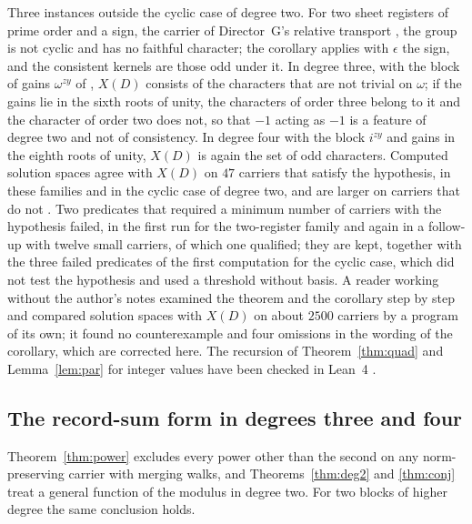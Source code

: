 Three instances outside the cyclic case of degree two. For two sheet registers of prime order and a sign, the carrier of Director~G's relative transport \cite{dgr}, the group is not cyclic and has no faithful character; the corollary applies with $\epsilon$ the sign, and the consistent kernels are those odd under it. In degree three, with the block of gains $\omega^{zy}$ of \cite{g9}, $X(D)$ consists of the characters that are not trivial on $\omega$; if the gains lie in the sixth roots of unity, the characters of order three belong to it and the character of order two does not, so that $-1$ acting as $-1$ is a feature of degree two and not of consistency. In degree four with the block $i^{zy}$ and gains in the eighth roots of unity, $X(D)$ is again the set of odd characters. Computed solution spaces agree with $X(D)$ on $47$ carriers that satisfy the hypothesis, in these families and in the cyclic case of degree two, and are larger on carriers that do not \cite{comp4s}. Two predicates that required a minimum number of carriers with the hypothesis failed, in the first run for the two-register family and again in a follow-up with twelve small carriers, of which one qualified; they are kept, together with the three failed predicates of the first computation for the cyclic case, which did not test the hypothesis and used a threshold without basis. A reader working without the author's notes examined the theorem and the corollary step by step and compared solution spaces with $X(D)$ on about $2500$ carriers by a program of its own; it found no counterexample and four omissions in the wording of the corollary, which are corrected here. The recursion of Theorem~\ref{thm:quad} and Lemma~\ref{lem:par} for integer values have been checked in Lean~4 \cite{comp4s}.

\subsection{The record-sum form in degrees three and four}
Theorem~\ref{thm:power} excludes every power other than the second on any norm-preserving carrier with merging walks, and Theorems~\ref{thm:deg2} and \ref{thm:conj} treat a general function of the modulus in degree two. For two blocks of higher degree the same conclusion holds.

